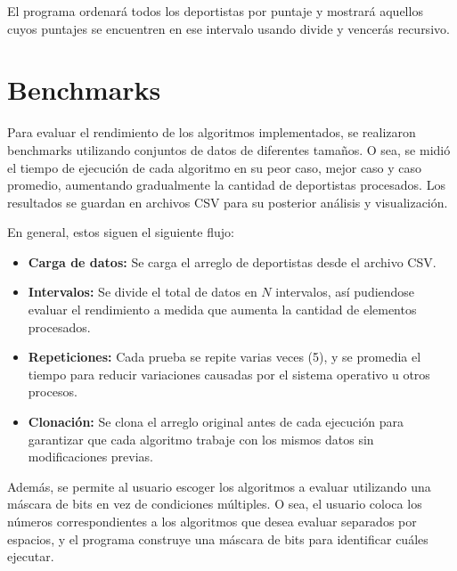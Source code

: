 El programa ordenará todos los deportistas por puntaje y mostrará aquellos cuyos puntajes se encuentren en ese intervalo usando divide y vencerás recursivo.

\section{Benchmarks}
Para evaluar el rendimiento de los algoritmos implementados, se realizaron benchmarks utilizando conjuntos de datos de diferentes tamaños. O sea, se midió el tiempo de ejecución de cada algoritmo en su peor caso, mejor caso y caso promedio, aumentando gradualmente la cantidad de deportistas procesados. Los resultados se guardan en archivos CSV para su posterior análisis y visualización.

En general, estos siguen el siguiente flujo:
\begin{itemize}
    \item \textbf{Carga de datos:} Se carga el arreglo de deportistas desde el archivo CSV.
    \item \textbf{Intervalos:} Se divide el total de datos en $N$ intervalos, así pudiendose evaluar el rendimiento a medida que aumenta la cantidad de elementos procesados.
    \item \textbf{Repeticiones:} Cada prueba se repite varias veces (5), y se promedia el tiempo para reducir variaciones causadas por el sistema operativo u otros procesos.
    \item \textbf{Clonación:} Se clona el arreglo original antes de cada ejecución para garantizar que cada algoritmo trabaje con los mismos datos sin modificaciones previas. 
\end{itemize}

Además, se permite al usuario escoger los algoritmos a evaluar utilizando una máscara de bits en vez de condiciones múltiples. O sea, el usuario coloca los números correspondientes a los algoritmos que desea evaluar separados por espacios, y el programa construye una máscara de bits para identificar cuáles ejecutar.

